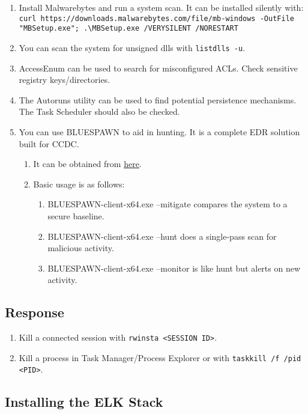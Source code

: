 \documentclass[12pt,letterpaper]{article}
\def\code#1{\textcolor{c2}{\texttt{#1}}}
\begin{document}
\begin{enumerate}
	\item Install Malwarebytes and run a system scan. It can be installed silently with: \\
		\code{curl https://downloads.malwarebytes.com/file/mb-windows -OutFile "MBSetup.exe"; .\textbackslash{}MBSetup.exe /VERYSILENT /NORESTART}
	\item You can scan the system for unsigned dlls with \code{listdlls -u}.
	\item AccessEnum can be used to search for misconfigured ACLs. Check sensitive registry keys/directories.
	\item The Autoruns utility can be used to find potential persistence mechanisms. The Task Scheduler should also be checked.
	\item You can use BLUESPAWN to aid in hunting. It is a complete EDR solution built for CCDC.
	\begin{enumerate}
		\item It can be obtained from \href{https://github.com/ION28/BLUESPAWN/releases/download/v0.5.1-alpha/BLUESPAWN-client-x64.exe}{here}.
		\item Basic usage is as follows:
		\begin{enumerate}
			\item BLUESPAWN-client-x64.exe --mitigate compares the system to a secure baseline.
			\item BLUESPAWN-client-x64.exe --hunt does a single-pass scan for malicious activity.
			\item BLUESPAWN-client-x64.exe --monitor is like hunt but alerts on new activity.
		\end{enumerate}
	\end{enumerate}
\end{enumerate}

\subsection{Response}

\begin{enumerate}
	\item Kill a connected session with \code{rwinsta <SESSION ID>}.
	\item Kill a process in Task Manager/Process Explorer or with \code{taskkill /f /pid <PID>}.
\end{enumerate}

\pagebreak

\subsection{Installing the ELK Stack}
\end{document}

